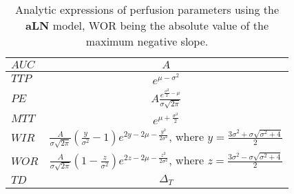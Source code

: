 \begin{table}[!h]
\begin{center}
\begin{tabular}{lc}
\toprule
\textbf{$AUC$} & $A$ \\
\midrule
\textbf{$TTP$} & $e^{\mu - \sigma^2}$  \\
\midrule
\textbf{$PE$} & $A\frac{e^{\frac{\sigma^2}{2}-\mu}}{\sigma \sqrt{2\pi}}$  \\
\midrule
\textbf{$MTT$} & $e^{\mu + \frac{\sigma^2}{2}}$ \\
\midrule
\textbf{$WIR$}
 & $\frac{A}{\sigma\sqrt{2\pi}}\left(\frac{y}{\sigma^2}-1\right)e^{2y-2\mu-\frac{y^2}{2\sigma^2}}$, where $y = \frac{3\sigma^2+\sigma\sqrt{\sigma^2+4}}{2}$ \\
\midrule
\textbf{$WOR$} & $\frac{A}{\sigma\sqrt{2\pi}}\left(1-\frac{z}{\sigma^2}\right)e^{2z-2\mu-\frac{z^2}{2\sigma^2}}$, where $z = \frac{3\sigma^2-\sigma\sqrt{\sigma^2+4}}{2}$ \\
\midrule
\textbf{$TD$} & $\Delta_T$ \\
\bottomrule
\end{tabular}
\caption{Analytic expressions of perfusion parameters using the \textbf{aLN} model, WOR being the absolute value of the maximum negative slope.}
\label{tab:AnalyticRelation}
\end{center}
\end{table}

